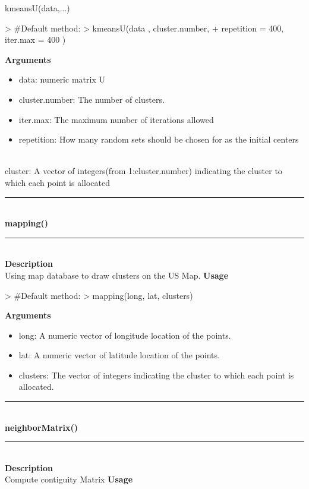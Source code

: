 \documentclass{article}
\begin{document}
 kmeansU(data,...)
\begin{Schunk}
\begin{Sinput}
>   #Default method:
>   kmeansU(data , cluster.number,
+           repetition = 400, iter.max = 400 )
\end{Sinput}
\end{Schunk}
{\bf Arguments}
\begin {itemize}
\item data: numeric matrix U
\item cluster.number: The number of clusters.
\item iter.max: The maximum number of iterations allowed
\item repetition: How many random sets should be chosen for as the initial centers
\end {itemize}
\hspace*{5mm}{\bf Returns}\\
cluster: A vector of integers(from 1:cluster.number)
indicating the cluster to which each point is allocated\\

\noindent\rule{14cm}{0.4pt}\\
{\bf \large mapping() } \\
\noindent\rule{14cm}{0.4pt}\\
{\bf Description}\\
   Using map database to draw clusters on the US Map.
{\bf Usage}\\


\begin{Schunk}
\begin{Sinput}
>   #Default method:
>   mapping(long, lat, clusters)
\end{Sinput}
\end{Schunk}
{\bf Arguments}
\begin {itemize}
\item long: A numeric vector of  longitude location of the points.
\item lat: A numeric vector of latitude location of the points.
\item clusters: The  vector of integers indicating the cluster to which each point is allocated.
  
\end {itemize}
 
\noindent\rule{14cm}{0.4pt}\\
{\bf \large neighborMatrix()} \\
\noindent\rule{14cm}{0.4pt}\\
{\bf Description}\\
    Compute contiguity Matrix 
{\bf Usage}\\
\end{document}

